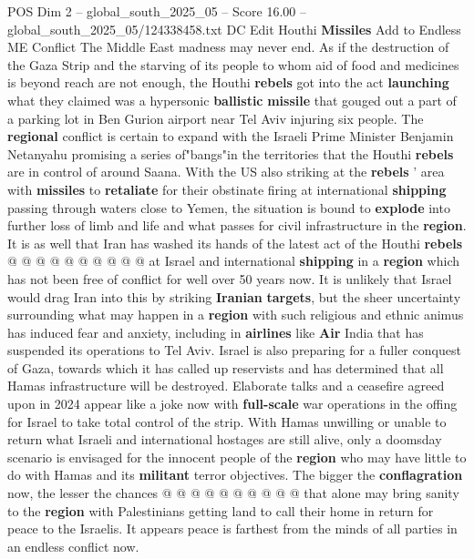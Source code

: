 \begin{textsample}{POS Dim 2 – global\_south\_2025\_05 – Score 16.00 – global\_south\_2025\_05/124338458.txt}  \label{ex:f2_pos_295}
DC Edit Houthi \textbf{Missiles} Add to Endless ME Conflict The Middle East madness may never end.
As if the destruction of the Gaza Strip and the starving of its people to whom aid of food and medicines is beyond reach are not enough, the Houthi \textbf{rebels} got into the act \textbf{launching} what they claimed was a hypersonic \textbf{ballistic} \textbf{missile} that gouged out a part of a parking lot in Ben Gurion airport near Tel Aviv injuring six people.
The \textbf{regional} conflict is certain to expand with the Israeli Prime Minister Benjamin Netanyahu promising a series of"bangs"in the territories that the Houthi \textbf{rebels} are in control of around Saana.
With the US also striking at the \textbf{rebels} ' area with \textbf{missiles} to \textbf{retaliate} for their obstinate firing at international \textbf{shipping} passing through waters close to Yemen, the situation is bound to \textbf{explode} into further loss of limb and life and what passes for civil infrastructure in the \textbf{region}.
It is as well that Iran has washed its hands of the latest act of the Houthi \textbf{rebels} @ @ @ @ @ @ @ @ @ @ at Israel and international \textbf{shipping} in a \textbf{region} which has not been free of conflict for well over 50 years now.
It is unlikely that Israel would drag Iran into this by striking \textbf{Iranian} \textbf{targets}, but the sheer uncertainty surrounding what may happen in a \textbf{region} with such religious and ethnic animus has induced fear and anxiety, including in \textbf{airlines} like \textbf{Air} India that has suspended its operations to Tel Aviv.
Israel is also preparing for a fuller conquest of Gaza, towards which it has called up reservists and has determined that all Hamas infrastructure will be destroyed.
Elaborate talks and a ceasefire agreed upon in 2024 appear like a joke now with \textbf{full-scale} war operations in the offing for Israel to take total control of the strip.
With Hamas unwilling or unable to return what Israeli and international hostages are still alive, only a doomsday scenario is envisaged for the innocent people of the \textbf{region} who may have little to do with Hamas and its \textbf{militant} terror objectives.
The bigger the \textbf{conflagration} now, the lesser the chances @ @ @ @ @ @ @ @ @ @ that alone may bring sanity to the \textbf{region} with Palestinians getting land to call their home in return for peace to the Israelis.
It appears peace is farthest from the minds of all parties in an endless conflict now.

\end{textsample}
